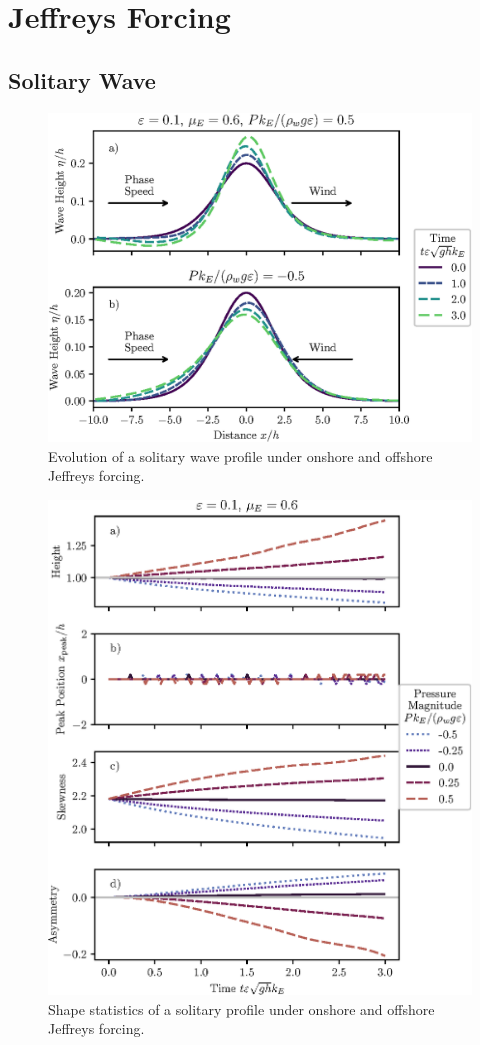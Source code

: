 \documentclass{jfm}
\let\Oldsection\section
\renewcommand{\section}{\FloatBarrier\Oldsection}
\let\Oldsubsection\subsection
\renewcommand{\subsection}{\FloatBarrier\Oldsubsection}
\begin{document}
\section{Jeffreys Forcing}
\subsection{Solitary Wave}
\begin{figure}
  \centering
  \includegraphics{Snapshots-Positive-Negative.eps}
  \caption{
    Evolution of a solitary wave profile under onshore and offshore Jeffreys
    forcing.
  }
\end{figure}

\begin{figure}
  \centering
  \includegraphics{Skew-Asymm.eps}
  \caption{
    Shape statistics of a solitary profile under onshore and offshore
    Jeffreys forcing.
  }
\end{figure}
\end{document}

